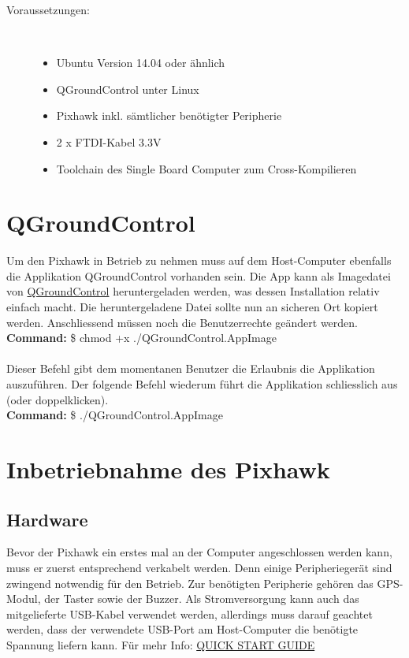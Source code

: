 \documentclass[12pt]{article} %
\begin{document}
	\begin{description}
		\item[Voraussetzungen:]~\par
		\begin{itemize}
			\item Ubuntu Version 14.04 oder ähnlich
			\item QGroundControl unter Linux
			\item Pixhawk inkl. sämtlicher benötigter Peripherie
			\item 2 x FTDI-Kabel 3.3V
			\item Toolchain des Single Board Computer zum Cross-Kompilieren
		\end{itemize}
	\end{description}
	
	
	
	\section{QGroundControl}
	Um den Pixhawk in Betrieb zu nehmen muss auf dem Host-Computer ebenfalls die Applikation QGroundControl vorhanden sein. Die App kann als Imagedatei von \href{https://donlakeflyer.gitbooks.io/qgroundcontrol-user-guide/content/download\_and\_install.html}{QGroundControl} heruntergeladen werden, was dessen Installation relativ einfach macht. Die heruntergeladene Datei sollte nun an sicheren Ort kopiert werden. Anschliessend müssen noch die Benutzerrechte geändert werden.
	\\
	\noindent\hspace*{30mm} \textbf{Command:} \$ chmod +x ./QGroundControl.AppImage\\
	\\
	Dieser Befehl gibt dem momentanen Benutzer die Erlaubnis die Applikation auszuführen. Der folgende Befehl wiederum führt die Applikation schliesslich aus (oder doppelklicken).\\[0.2cm]
	
	\noindent\hspace*{30mm} \textbf{Command:} \$ ./QGroundControl.AppImage
	
	\section{Inbetriebnahme des Pixhawk}
	
	\subsection{Hardware}
	Bevor der Pixhawk ein erstes mal an der Computer angeschlossen werden kann, muss er zuerst entsprechend verkabelt werden. Denn einige Peripheriegerät sind zwingend notwendig für den Betrieb. Zur benötigten Peripherie gehören das GPS-Modul, der Taster sowie der Buzzer. Als Stromversorgung kann auch das mitgelieferte USB-Kabel verwendet werden, allerdings muss darauf geachtet werden, dass der verwendete USB-Port am Host-Computer die benötigte Spannung liefern kann. Für mehr Info: \href{https://3dr.com/wp-content/uploads/2014/03/pixhawk-manual-rev7.pdf}{QUICK START GUIDE}
	
\end{document}
